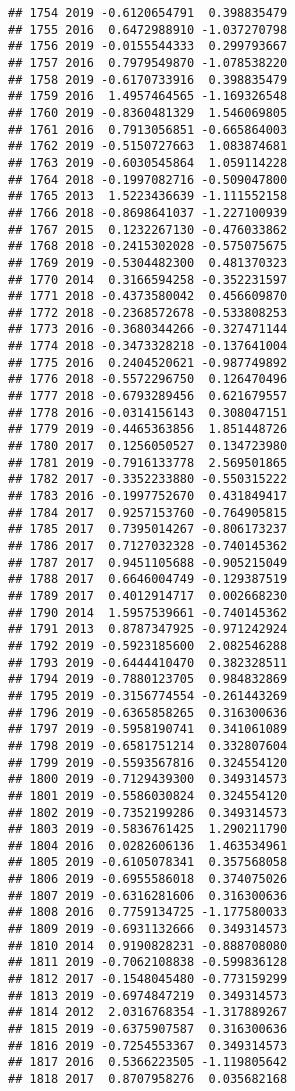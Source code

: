 \documentclass[
]{article}
\begin{document}
\begin{verbatim}
## 1754 2019 -0.6120654791  0.398835479
## 1755 2016  0.6472988910 -1.037270798
## 1756 2019 -0.0155544333  0.299793667
## 1757 2016  0.7979549870 -1.078538220
## 1758 2019 -0.6170733916  0.398835479
## 1759 2016  1.4957464565 -1.169326548
## 1760 2019 -0.8360481329  1.546069805
## 1761 2016  0.7913056851 -0.665864003
## 1762 2019 -0.5150727663  1.083874681
## 1763 2019 -0.6030545864  1.059114228
## 1764 2018 -0.1997082716 -0.509047800
## 1765 2013  1.5223436639 -1.111552158
## 1766 2018 -0.8698641037 -1.227100939
## 1767 2015  0.1232267130 -0.476033862
## 1768 2018 -0.2415302028 -0.575075675
## 1769 2019 -0.5304482300  0.481370323
## 1770 2014  0.3166594258 -0.352231597
## 1771 2018 -0.4373580042  0.456609870
## 1772 2018 -0.2368572678 -0.533808253
## 1773 2016 -0.3680344266 -0.327471144
## 1774 2018 -0.3473328218 -0.137641004
## 1775 2016  0.2404520621 -0.987749892
## 1776 2018 -0.5572296750  0.126470496
## 1777 2018 -0.6793289456  0.621679557
## 1778 2016 -0.0314156143  0.308047151
## 1779 2019 -0.4465363856  1.851448726
## 1780 2017  0.1256050527  0.134723980
## 1781 2019 -0.7916133778  2.569501865
## 1782 2017 -0.3352233880 -0.550315222
## 1783 2016 -0.1997752670  0.431849417
## 1784 2017  0.9257153760 -0.764905815
## 1785 2017  0.7395014267 -0.806173237
## 1786 2017  0.7127032328 -0.740145362
## 1787 2017  0.9451105688 -0.905215049
## 1788 2017  0.6646004749 -0.129387519
## 1789 2017  0.4012914717  0.002668230
## 1790 2014  1.5957539661 -0.740145362
## 1791 2013  0.8787347925 -0.971242924
## 1792 2019 -0.5923185600  2.082546288
## 1793 2019 -0.6444410470  0.382328511
## 1794 2019 -0.7880123705  0.984832869
## 1795 2019 -0.3156774554 -0.261443269
## 1796 2019 -0.6365858265  0.316300636
## 1797 2019 -0.5958190741  0.341061089
## 1798 2019 -0.6581751214  0.332807604
## 1799 2019 -0.5593567816  0.324554120
## 1800 2019 -0.7129439300  0.349314573
## 1801 2019 -0.5586030824  0.324554120
## 1802 2019 -0.7352199286  0.349314573
## 1803 2019 -0.5836761425  1.290211790
## 1804 2016  0.0282606136  1.463534961
## 1805 2019 -0.6105078341  0.357568058
## 1806 2019 -0.6955586018  0.374075026
## 1807 2019 -0.6316281606  0.316300636
## 1808 2016  0.7759134725 -1.177580033
## 1809 2019 -0.6931132666  0.349314573
## 1810 2014  0.9190828231 -0.888708080
## 1811 2019 -0.7062108838 -0.599836128
## 1812 2017 -0.1548045480 -0.773159299
## 1813 2019 -0.6974847219  0.349314573
## 1814 2012  2.0316768354 -1.317889267
## 1815 2019 -0.6375907587  0.316300636
## 1816 2019 -0.7254553367  0.349314573
## 1817 2016  0.5366223505 -1.119805642
## 1818 2017  0.8707958276  0.035682168

\end{verbatim}
\end{document}
